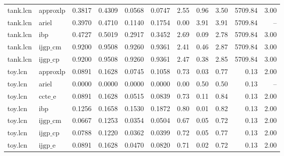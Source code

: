 \begin{table}[ht]
\begin{tabular}{llrrrrrrrrr}
tank.lcn & approxlp & 0.3817 & 0.4309 & 0.0568 & 0.0747 & 2.55 & 0.96 & 3.50 & 5709.84 & 3.00 \\
tank.lcn & ariel & 0.3970 & 0.4710 & 0.1140 & 0.1754 & 0.00 & 3.91 & 3.91 & 5709.84 & -- \\
tank.lcn & ibp & 0.4727 & 0.5019 & 0.2917 & 0.3452 & 2.69 & 0.09 & 2.78 & 5709.84 & 3.00 \\
tank.lcn & $\text{ijgp\_cm}$ & 0.9200 & 0.9508 & 0.9260 & 0.9361 & 2.41 & 0.46 & 2.87 & 5709.84 & 3.00 \\
tank.lcn & $\text{ijgp\_cp}$ & 0.9200 & 0.9508 & 0.9260 & 0.9361 & 2.47 & 0.38 & 2.85 & 5709.84 & 3.00 \\
toy.lcn & approxlp & 0.0891 & 0.1628 & 0.0745 & 0.1058 & 0.73 & 0.03 & 0.77 & 0.13 & 2.00 \\
toy.lcn & ariel & 0.0000 & 0.0000 & 0.0000 & 0.0000 & 0.00 & 0.50 & 0.50 & 0.13 & -- \\
toy.lcn & $\text{ccte\_e}$ & 0.0891 & 0.1628 & 0.0515 & 0.0839 & 0.73 & 0.11 & 0.84 & 0.13 & 2.00 \\
toy.lcn & ibp & 0.1256 & 0.1658 & 0.1530 & 0.1872 & 0.80 & 0.01 & 0.82 & 0.13 & 2.00 \\
toy.lcn & $\text{ijgp\_cm}$ & 0.0667 & 0.1253 & 0.0354 & 0.0504 & 0.67 & 0.05 & 0.72 & 0.13 & 2.00 \\
toy.lcn & $\text{ijgp\_cp}$ & 0.0788 & 0.1220 & 0.0362 & 0.0399 & 0.72 & 0.05 & 0.77 & 0.13 & 2.00 \\
toy.lcn & $\text{ijgp\_e}$ & 0.0891 & 0.1628 & 0.0470 & 0.0820 & 0.71 & 0.02 & 0.72 & 0.13 & 2.00 \\
\bottomrule
\end{tabular}
\end{table}
